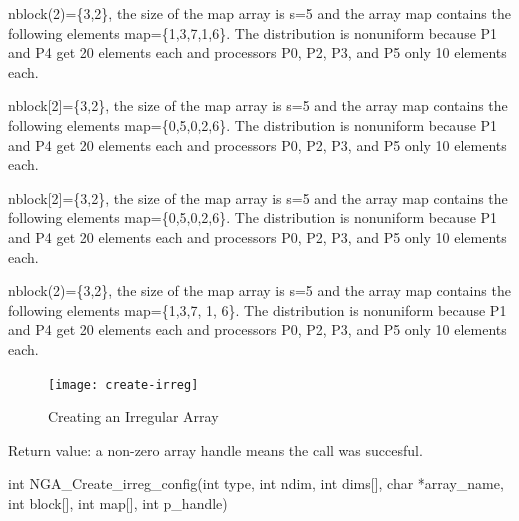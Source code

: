 \documentclass[12pt]{article}
\begin{document}
\begin{fdesc}
nblock(2)=\{3,2\}, the size of the map array is s=5 and the array map contains
the following elements map=\{1,3,7,1,6\}. The distribution is nonuniform
because P1 and P4 get 20 elements each and processors P0, P2, P3, and P5 only
10 elements each.
\end{fdesc}

\begin{cdesc}
nblock[2]=\{3,2\}, the size of the map array is s=5 and the array map contains
the following elements map=\{0,5,0,2,6\}. The distribution is nonuniform
because P1 and P4 get 20 elements each and processors P0, P2, P3, and P5 only
10 elements each.
\end{cdesc}

\begin{cxxdesc}
nblock[2]=\{3,2\}, the size of the map array is s=5 and the array map contains
the following elements map=\{0,5,0,2,6\}. The distribution is nonuniform
because P1 and P4 get 20 elements each and processors P0, P2, P3, and P5 only
10 elements each.
\end{cxxdesc}

\begin{pydesc}
nblock(2)=\{3,2\}, the size of the map array is s=5 and the array map contains
the following elements map=\{1,3,7, 1, 6\}. The distribution is nonuniform
because P1 and P4 get 20 elements each and processors P0, P2, P3, and P5 only
10 elements each.
\end{pydesc}

\begin{desc}
\begin{figure}
\texttt{[image: create-irreg]}
\centering
\caption{Creating an Irregular Array}
\label{crirreg}
\end{figure}

Return value: a non-zero array handle means the call was succesful.

\end{desc}



\begin{capi}
\begin{ccode}
int NGA_Create_irreg_config(int type, int ndim, int dims[],
                            char *array_name, int block[], int map[],
                            int p_handle)
\end{ccode}
\begin{funcargs}
\end{funcargs}
\end{capi}
\end{document}
